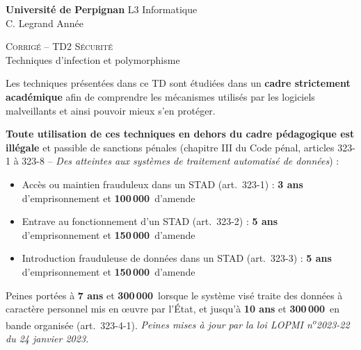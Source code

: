 \documentclass[a4paper,11pt]{article}
\theoremstyle{plain}
\theoremstyle{definition}
\begin{document}
\hbox{}
\noindent \textbf{Université de Perpignan} \hfill  L3 Informatique \\
 \hfill C. Legrand \hfill  Année \the\year \\
\smallskip
\begin{center}
{
  {\scshape \large Corrigé -- TD2 Sécurité}  \\
 Techniques d'infection et polymorphisme
}
\end{center}
\hbox{}

\bigskip

\begin{ethique}
Les techniques présentées dans ce TD sont étudiées dans un \textbf{cadre strictement académique} afin de comprendre les mécanismes utilisés par les logiciels malveillants et ainsi pouvoir mieux s'en protéger.

\textbf{Toute utilisation de ces techniques en dehors du cadre pédagogique est illégale} et passible de sanctions pénales (chapitre III du Code pénal, articles 323-1 à 323-8 -- \textit{Des atteintes aux systèmes de traitement automatisé de données}) :
\begin{itemize}
    \item Accès ou maintien frauduleux dans un STAD (art.~323-1) : \textbf{3 ans} d'emprisonnement et \textbf{100\,000\,\texteuro{}} d'amende
    \item Entrave au fonctionnement d'un STAD (art.~323-2) : \textbf{5 ans} d'emprisonnement et \textbf{150\,000\,\texteuro{}} d'amende
    \item Introduction frauduleuse de données dans un STAD (art.~323-3) : \textbf{5 ans} d'emprisonnement et \textbf{150\,000\,\texteuro{}} d'amende
\end{itemize}
Peines portées à \textbf{7 ans} et \textbf{300\,000\,\texteuro{}} lorsque le système visé traite des données à caractère personnel mis en \oe uvre par l'État, et jusqu'à \textbf{10 ans} et \textbf{300\,000\,\texteuro{}} en bande organisée (art.~323-4-1). \textit{Peines mises à jour par la loi LOPMI n\textsuperscript{o}2023-22 du 24 janvier 2023.}
\end{ethique}

\bigskip

\end{document}
